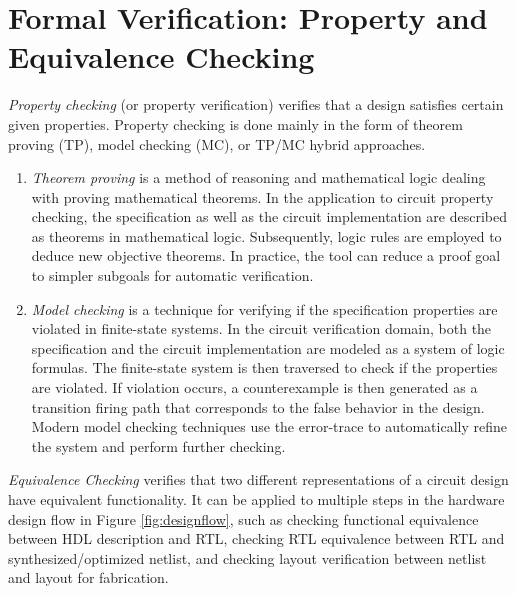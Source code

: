 \section{Formal Verification: Property and Equivalence Checking}
{\it Property checking} (or property verification) verifies
that a design satisfies certain given properties. Property checking is done mainly 
in the form of theorem proving (TP), model checking (MC), or TP/MC hybrid approaches.
\begin{enumerate}[{1)}]
\item \emph{Theorem proving} \cite{theoremproving:91} 
is a method of reasoning and mathematical logic dealing with proving 
mathematical theorems. In the application to circuit property checking, 
the specification as well as the circuit implementation
are described as theorems in mathematical logic. Subsequently, logic rules
are employed to deduce new objective theorems. In practice, the tool can reduce
a proof goal to simpler subgoals for automatic verification.

\item \emph{Model checking} \cite{modelcheck:99} is a technique 
for verifying if the specification properties are violated in finite-state systems. In the circuit verification 
domain, both the specification and the circuit implementation are modeled as a system of 
logic formulas. The finite-state system is then traversed to check if the 
properties are violated. If violation occurs, 
a counterexample is then generated as a transition firing path that corresponds to the
false behavior in the design. 
Modern model checking techniques use the error-trace to automatically refine
the system and perform further checking.
\end{enumerate}

{\it Equivalence Checking} verifies that two different representations of
a circuit design have equivalent functionality. It can be applied to 
multiple steps in the hardware design flow in Figure \ref{fig:designflow},
such as checking functional equivalence between HDL description and RTL,
checking RTL equivalence between RTL and synthesized/optimized netlist, 
and checking layout verification between netlist and layout for fabrication.

